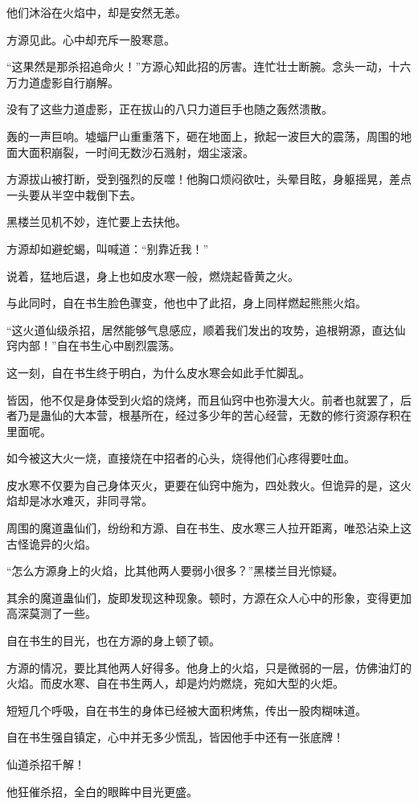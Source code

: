 \begin{this_body}
他们沐浴在火焰中，却是安然无恙。

方源见此。心中却充斥一股寒意。

“这果然是那杀招追命火！”方源心知此招的厉害。连忙壮士断腕。念头一动，十六万力道虚影自行崩解。

没有了这些力道虚影，正在拔山的八只力道巨手也随之轰然溃散。

轰的一声巨响。墟蝠尸山重重落下，砸在地面上，掀起一波巨大的震荡，周围的地面大面积崩裂，一时间无数沙石溅射，烟尘滚滚。

方源拔山被打断，受到强烈的反噬！他胸口烦闷欲吐，头晕目眩，身躯摇晃，差点一头要从半空中栽倒下去。

黑楼兰见机不妙，连忙要上去扶他。

方源却如避蛇蝎，叫喊道：“别靠近我！”

说着，猛地后退，身上也如皮水寒一般，燃烧起昏黄之火。

与此同时，自在书生脸色骤变，他也中了此招，身上同样燃起熊熊火焰。

“这火道仙级杀招，居然能够气息感应，顺着我们发出的攻势，追根朔源，直达仙窍内部！”自在书生心中剧烈震荡。

这一刻，自在书生终于明白，为什么皮水寒会如此手忙脚乱。

皆因，他不仅是身体受到火焰的烧烤，而且仙窍中也弥漫大火。前者也就罢了，后者乃是蛊仙的大本营，根基所在，经过多少年的苦心经营，无数的修行资源存积在里面呢。

如今被这大火一烧，直接烧在中招者的心头，烧得他们心疼得要吐血。

皮水寒不仅要为自己身体灭火，更要在仙窍中施为，四处救火。但诡异的是，这火焰却是冰水难灭，非同寻常。

周围的魔道蛊仙们，纷纷和方源、自在书生、皮水寒三人拉开距离，唯恐沾染上这古怪诡异的火焰。

“怎么方源身上的火焰，比其他两人要弱小很多？”黑楼兰目光惊疑。

其余的魔道蛊仙们，旋即发现这种现象。顿时，方源在众人心中的形象，变得更加高深莫测了一些。

自在书生的目光，也在方源的身上顿了顿。

方源的情况，要比其他两人好得多。他身上的火焰，只是微弱的一层，仿佛油灯的火焰。而皮水寒、自在书生两人，却是灼灼燃烧，宛如大型的火炬。

短短几个呼吸，自在书生的身体已经被大面积烤焦，传出一股肉糊味道。

自在书生强自镇定，心中并无多少慌乱，皆因他手中还有一张底牌！

仙道杀招千解！

他狂催杀招，全白的眼眸中目光更盛。


\end{this_body}
